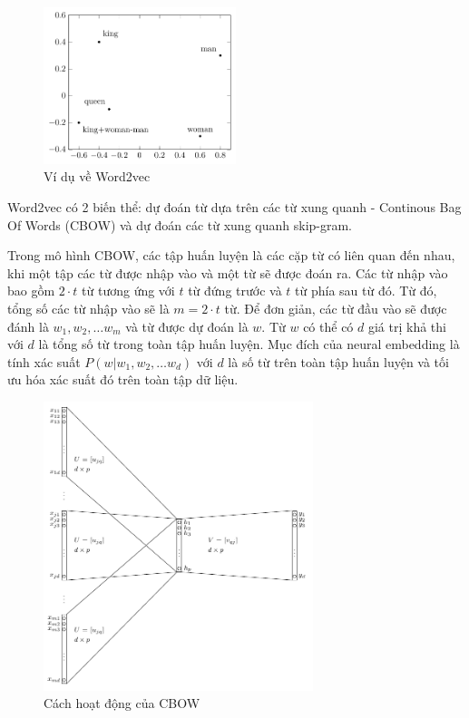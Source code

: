 \begin{figure}[htb]
    \centering
    \includegraphics[width=0.5\textwidth]{tikz_image/word2vec_example.pdf}
    \caption{Ví dụ về Word2vec}
    \label{figure:word2vec-example}
\end{figure}

Word2vec có 2 biến thể: dự đoán từ dựa trên các từ xung quanh - Continous Bag Of Words (CBOW) và dự đoán các từ xung quanh skip-gram.

Trong mô hình CBOW, các tập huấn luyện là các cặp từ có liên quan đến nhau, khi một tập các từ được nhập vào và một từ sẽ được đoán ra. Các từ nhập vào bao gồm $2\cdot t$ từ tương ứng với $t$ từ đứng trước và $t$ từ phía sau từ đó. Từ đó, tổng số các từ nhập vào sẽ là $m = 2\cdot t$ từ. Để đơn giản, các từ đầu vào sẽ được đánh là $w_1, w_2,\dots w_m$  và từ được dự đoán là $w$. Từ $w$ có thể có $d$ giá trị khả thi với $d$ là tổng số từ trong toàn tập huấn luyện. Mục đích của neural embedding là tính xác suất $P(w|w_1,w_2,\dots w_d)$ với $d$ là số từ trên toàn tập huấn luyện và tối ưu hóa xác suất đó trên toàn tập dữ liệu.
\begin{figure}[htb!]
    \centering
    \includegraphics[width=0.7\textwidth]{tikz_image/word2vec_cbow.pdf}
    \caption[Cách hoạt động của CBOW]{Cách hoạt động của CBOW \cite{Aggarwal2022}}
    \label{figure:word2vec-cbow}
\end{figure}

